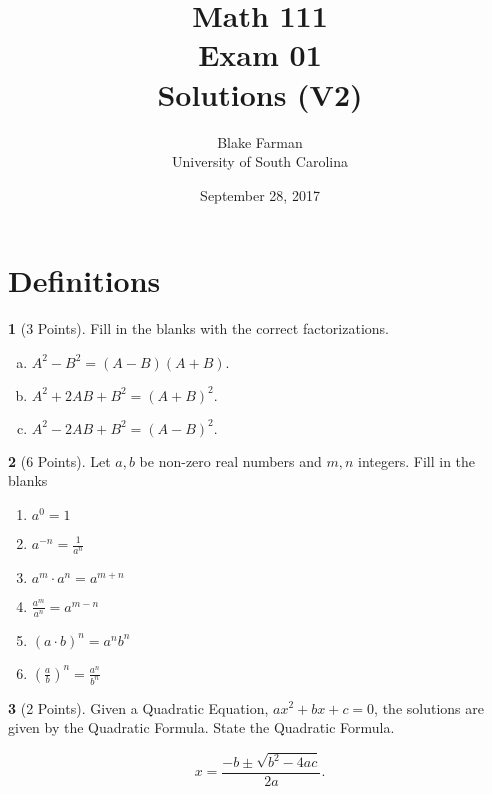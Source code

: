 \documentclass[12pt]{amsart}
\author{Blake Farman\\University of South Carolina}
\title{Math 111\\ Exam 01\\Solutions (V2)}
\date{September 28, 2017}
\begin{document}
\maketitle

\theoremstyle{definition}
\newtheorem{thm}{}
\newtheorem{defn}{Definition}
\newtheorem*{rmk}{Remark}

\section{Definitions}
\begin{thm}[3 Points]\label{ex1}
  Fill in the blanks with the correct factorizations.
  \begin{enumerate}[(a)]
  \item
    $\displaystyle{A^2 - B^2 = (A - B)(A + B)}.$
    \vspace{.3in}
  \item
    $\displaystyle{A^2 + 2AB + B^2 = (A + B)^2}.$
    \vspace{.3in}
  \item
    $\displaystyle{A^2 - 2AB + B^2 = (A - B)^2}.$
    \vspace{.3in}
  \end{enumerate}
\end{thm}
\vspace{.5in}
\begin{thm}[6 Points]\label{ex2}
    Let $a, b$ be non-zero real numbers and $m, n$ integers.
  Fill in the blanks
  \vspace{.25in}
  \begin{multicols}{2}
    \begin{enumerate}
    \item
      $\displaystyle{a^0 = 1}$
      \vspace{.4in}
    \item
      $\displaystyle{a^{-n} = \frac{1}{a^n}}$
      \vspace{.3in}
    \item
      $\displaystyle{a^m \cdot a^n = a^{m+n}}$
    \item
      $\displaystyle{\frac{a^m}{a^n}= a^{m-n}}$
      \vspace{.25in}
    \item
      $\displaystyle{\left(a \cdot b\right)^n = a^n b^n}$
      \vspace{.25in}
    \item
      $\displaystyle{\left(\frac{a}{b}\right)^n = \frac{a^n}{b^n}}$
    \end{enumerate}
  \end{multicols}
\end{thm}
\newpage
\begin{thm}[2 Points]\label{ex3}
  Given a Quadratic Equation, $ax^2 + bx + c = 0$, the solutions are given by the Quadratic Formula.  State the Quadratic Formula.

  $$x = \frac{-b \pm \sqrt{b^2 - 4ac}}{2a}.$$
\end{thm}
\end{document}
